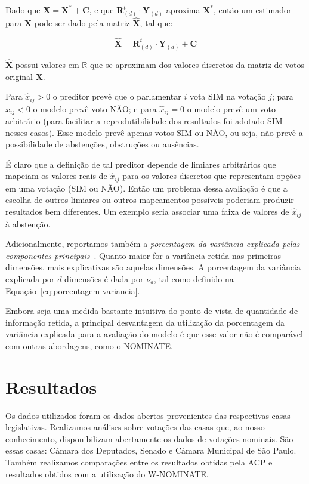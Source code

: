 \documentclass[
	article,			%
	12pt,				%
	oneside,			%
	a4paper,			%
	english,			%
	brazil,				%
	sumario=tradicional,
	oldfontcommands %
	]{abntex2}
\newcommand\nay{NÃO\xspace}
\newcommand\yea{SIM\xspace}
\newcommand\nominate{NOMINATE\xspace}
\newcommand\wnominate{W-NOMINATE\xspace}
\begin{document}
Dado que $\mathbf{X = X^* + C}$, e que $\mathbf{R}_{(d)}^{t}\cdot \mathbf{Y}_{(d)}$ aproxima $\mathbf{X^*}$, então um estimador para $\mathbf{X}$ pode ser dado pela matriz $\mathbf{\widehat{X}}$, tal que:

\begin{equation}
  \widehat{\mathbf{X}} = \mathbf{R}_{(d)}^{t} \cdot \mathbf{Y}_{(d)} + \mathbf{C}
\end{equation}

$\widehat{\mathbf{X}}$ possui valores em $\mathbb{R}$ que se aproximam dos valores discretos da matriz de votos original $\mathbf{X}$.

Para $\widehat{x}_{ij} > 0$ o preditor prevê que o parlamentar $i$ vota \yea na votação $j$; para $\widehat{x}_{ij} < 0$ o modelo prevê voto \nay; e para $\widehat{x}_{ij} = 0$ o modelo prevê um voto arbitrário (para facilitar a reprodutibilidade dos resultados foi adotado \yea nesses casos). Esse modelo prevê apenas votos \yea ou \nay, ou seja, não prevê a possibilidade de abstenções, obstruções ou ausências.

É claro que a definição de tal preditor depende de limiares arbitrários que mapeiam os valores reais de $\widehat{x}_{ij}$ para os valores discretos que representam opções em uma votação (\yea ou \nay). Então um problema dessa avaliação é que a escolha de outros limiares ou outros mapeamentos possíveis poderiam produzir resultados bem diferentes. Um exemplo seria associar uma faixa de valores de $\widehat{x}_{ij}$ à abstenção.

Adicionalmente, reportamos também a \emph{porcentagem da variância explicada pelas componentes principais}~\cite{DataMining2003}. Quanto maior for a variância retida nas primeiras dimensões, mais explicativas são aquelas dimensões. A porcentagem da variância explicada por $d$ dimensões é dada por $\nu_d$, tal como definido na Equação~\ref{eq:porcentagem-variancia}.

Embora seja uma medida bastante intuitiva do ponto de vista de quantidade de informação retida, a principal desvantagem da utilização da porcentagem da variância explicada para a avaliação do modelo é que esse valor não é comparável com outras abordagens, como o \nominate.

\section{Resultados}
\label{sec:resultados}

Os dados utilizados foram os dados abertos provenientes das respectivas casas legislativas. Realizamos análises sobre votações das casas que, ao nosso conhecimento, disponibilizam abertamente os dados de votações nominais. São essas casas: Câmara dos Deputados, Senado e Câmara Municipal de São Paulo. Também realizamos comparações entre os resultados obtidas pela ACP e resultados obtidos com a utilização do \wnominate.  
\end{document}
